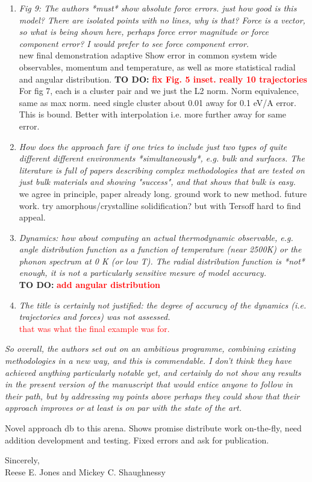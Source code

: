 \documentclass[11pt,twoside]{article}
\newcommand{\revise}[1]{\textcolor{red}{{#1}}} %
\newcommand{\todo}[1]{{\bf TO DO:} \textcolor{red}{\bf{#1}}}
\begin{document}
\begin{enumerate}
\item{\it
Fig 9: The authors *must* show absolute force errors. just how good
   is this model? There are isolated points with no lines, why is
   that? Force is a vector, so what is being shown here, perhaps force
   error magnitude or force component error? I would prefer to see
   force component error.
}\\[0.1in]
new final demonstration adaptive
Show error in common system wide observables, momentum and temperature, as well as more statistical radial and angular distribution.
\todo{fix Fig. 5 inset. really 10 trajectories}
For fig 7, each is a cluster pair and we just the L2 norm. 
Norm equivalence, same as max norm.
need single cluster about 0.01 away for 0.1 eV/A error.
This is bound.
Better with interpolation i.e. more further away for same error.

\item{\it
How does the approach fare if one tries to include just two types
    of quite different different environments *simultaneously*,
    e.g. bulk and surfaces. The literature is full of papers
    describing complex methodologies that are tested on just bulk
    materials and showing "success", and that shows that bulk is easy.
}\\[0.1in]
we agree in principle, paper already long. 
ground work to new method. 
future work.
try amorphous/crystalline solidification? but with Tersoff hard to find appeal.

\item{\it
Dynamics: how about computing an actual thermodynamic observable,
    e.g. angle distribution function as a function of temperature
    (near 2500K) or the phonon spectrum at 0 K (or low T). The radial
    distribution function is *not* enough, it is not a particularly
    sensitive mesure of model accuracy.
}\\[0.1in]
\todo{add angular distribution}

\item{\it
The title is certainly not justified: the degree of accuracy of
    the dynamics (i.e. trajectories and forces) was not assessed.
}\\[0.1in]
\revise{
that was what the final example was for. }
\end{enumerate}

{\it
So overall, the authors set out on an ambitious programme, combining
existing methodologies in a new way, and this is commendable. I don't
think they have achieved anything particularly notable yet, and
certainly do not show any results in the present version of the
manuscript that would entice anyone to follow in their path, but by
addressing my points above perhaps they could show that their approach
improves or at least is on par with the state of the art.
}

Novel approach db to this arena.
Shows promise distribute work on-the-fly, need addition development and testing.
Fixed errors and ask for publication.

\vskip 0.25in
Sincerely,\\
\vskip 0.05in
Reese E. Jones and Mickey C. Shaughnessy
\end{document}
